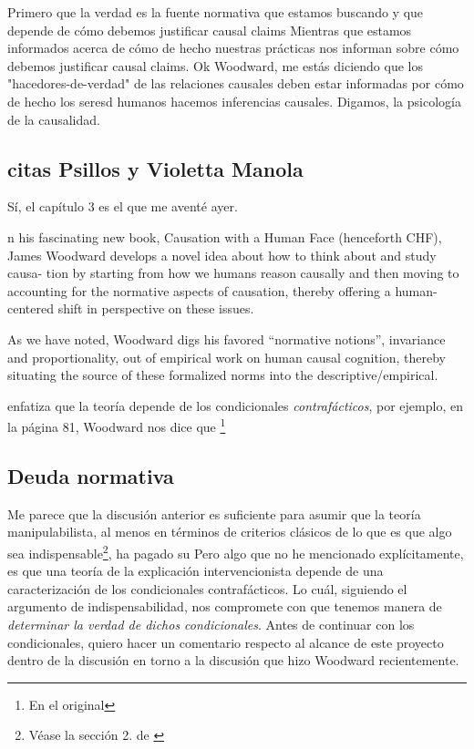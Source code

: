 Primero que la verdad es la fuente normativa que estamos
buscando y que depende de cómo debemos justificar causal
claims Mientras que estamos informados acerca de cómo de
hecho nuestras prácticas nos informan sobre cómo debemos
justificar causal claims. Ok Woodward, me estás diciendo que
los "hacedores-de-verdad" de las relaciones causales deben
estar informadas por cómo de hecho los seresd humanos
hacemos inferencias causales. Digamos, la psicología de la
causalidad. 





\subsection{citas Psillos y Violetta Manola}

Sí, el capítulo 3 es el que me aventé ayer. 

n his fascinating new book, Causation with a Human Face (henceforth CHF),
James Woodward develops a novel idea about how to think about and study causa-
tion by starting from how we humans reason causally and then moving to accounting
for the normative aspects of causation, thereby offering a human-centered shift in
perspective on these issues. 


As we have noted, Woodward digs his favored “normative notions”, invariance
and proportionality, out of empirical work on human causal cognition, thereby
situating the source of these formalized norms into the descriptive/empirical.





enfatiza que
la teoría depende de los condicionales
\emph{contrafácticos}, por ejemplo, en la página 81,
Woodward nos dice que \footnote{ 
    En el original 
}
 


\subsection{Deuda normativa}

Me parece que la discusión anterior es suficiente para
asumir que la teoría manipulabilista, al menos en términos
de criterios clásicos de lo que es que algo sea
indispensable\footnote{
  Véase la sección 2. 
  de \parencite{indis}
},
ha pagado su  Pero algo que no he
mencionado explícitamente, es que una teoría de la
explicación intervencionista depende de una caracterización
de los condicionales contrafácticos. Lo cuál, siguiendo el
argumento de indispensabilidad, nos compromete con que
tenemos manera de \emph{determinar la verdad de dichos
condicionales}. Antes de continuar con los condicionales,
quiero hacer un comentario respecto al alcance de este
proyecto dentro de la discusión en torno a la discusión que
hizo Woodward recientemente.

